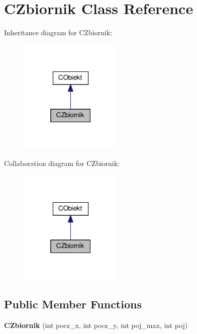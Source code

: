\hypertarget{class_c_zbiornik}{}\section{C\+Zbiornik Class Reference}
\label{class_c_zbiornik}


Inheritance diagram for C\+Zbiornik\+:\nopagebreak
\begin{figure}[H]
\begin{center}
\leavevmode
\includegraphics[width=139pt]{class_c_zbiornik__inherit__graph}
\end{center}
\end{figure}


Collaboration diagram for C\+Zbiornik\+:\nopagebreak
\begin{figure}[H]
\begin{center}
\leavevmode
\includegraphics[width=139pt]{class_c_zbiornik__coll__graph}
\end{center}
\end{figure}
\subsection*{Public Member Functions}
\begin{DoxyCompactItemize}
\item 
\mbox{\label{class_c_zbiornik_ad96816adb92591c4bbf3310d1c3a6ab4}} 
{\bfseries C\+Zbiornik} (int pocz\+\_\+x, int pocz\+\_\+y, int poj\+\_\+max, int poj)
\end{DoxyCompactItemize}
